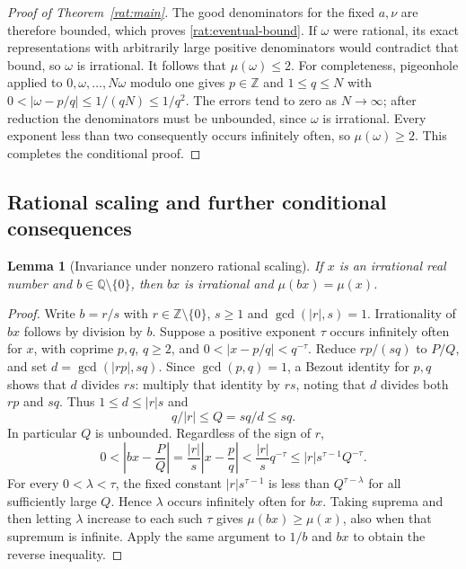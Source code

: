 \documentclass[11pt]{article}
\newcommand{\QQ}{\mathbb Q}
\newcommand{\ZZ}{\mathbb Z}
\newtheorem{lemma}[theorem]{Lemma}
\theoremstyle{definition}
\theoremstyle{remark}
\numberwithin{equation}{section}
\begin{document}
\begin{proof}[Proof of Theorem~\ref{rat:main}]
The good denominators for the fixed $a,\nu$ are therefore bounded,
which proves \eqref{rat:eventual-bound}.  If $\omega$ were rational,
its exact representations with arbitrarily large positive denominators
would contradict that bound, so $\omega$ is irrational.
It follows that $\mu(\omega)\le2$.
For completeness, pigeonhole applied to $0,\omega,\ldots,N\omega$
modulo one gives $p\in\ZZ$ and $1\le q\le N$ with
$0<|\omega-p/q|\le1/(qN)\le1/q^2$.
The errors tend to zero as $N\to\infty$; after reduction the denominators
must be unbounded, since $\omega$ is irrational.
Every exponent less than two consequently occurs infinitely often,
so $\mu(\omega)\ge2$.  This completes the conditional proof.
\end{proof}

\subsection{Rational scaling and further conditional consequences}

\begin{lemma}[Invariance under nonzero rational scaling]
\label{rat:scaling}
If $x$ is an irrational real number and $b\in\QQ\setminus\{0\}$,
then $bx$ is irrational and $\mu(bx)=\mu(x)$.
\end{lemma}

\begin{proof}
Write $b=r/s$ with $r\in\ZZ\setminus\{0\}$, $s\ge1$ and
$\gcd(|r|,s)=1$.  Irrationality of $bx$ follows by division by $b$.
Suppose a positive exponent $\tau$ occurs infinitely often for $x$,
with coprime $p,q$, $q\ge2$, and
$0<|x-p/q|<q^{-\tau}$.
Reduce $rp/(sq)$ to $P/Q$, and set $d=\gcd(|rp|,sq)$.
Since $\gcd(p,q)=1$, a Bezout identity for $p,q$ shows that $d$ divides
$rs$: multiply that identity by $rs$, noting that $d$ divides both
$rp$ and $sq$.  Thus $1\le d\le|r|s$ and
\[
 q/|r|\le Q=sq/d\le sq.
\]
In particular $Q$ is unbounded.  Regardless of the sign of $r$,
\[
 0<\left|bx-\frac PQ\right|
 =\frac{|r|}{s}\left|x-\frac pq\right|
 <\frac{|r|}{s}q^{-\tau}
 \le |r|s^{\tau-1}Q^{-\tau}.
\]
For every $0<\lambda<\tau$, the fixed constant $|r|s^{\tau-1}$ is
less than $Q^{\tau-\lambda}$ for all sufficiently large $Q$.
Hence $\lambda$ occurs infinitely often for $bx$.
Taking suprema and then letting $\lambda$ increase to each such
$\tau$ gives $\mu(bx)\ge\mu(x)$, also when that supremum is infinite.
Apply the same argument to $1/b$ and $bx$ to obtain the reverse inequality.
\end{proof}
\end{document}
